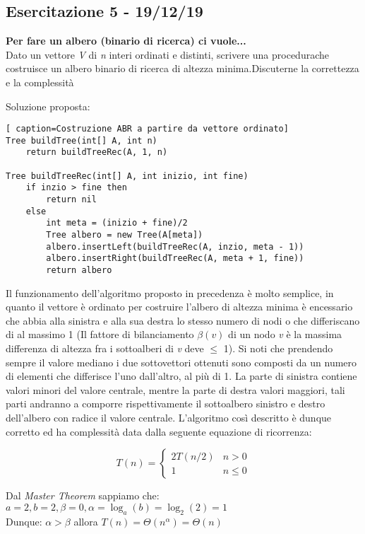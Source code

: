 \documentclass[../cheatSheetAlgoritmi.tex]{subfiles}
\begin{document}
\subsection{Esercitazione 5 - 19/12/19}
\textbf{Per fare un albero (binario di ricerca) ci vuole...}\\
Dato un vettore \textit{V} di \textit{n} interi ordinati e distinti, scrivere una procedurache costruisce un albero binario di ricerca di altezza minima.Discuterne la correttezza e la complessità

\bigskip
Soluzione proposta:
\begin{lstlisting}[ caption=Costruzione ABR a partire da vettore ordinato]
Tree buildTree(int[] A, int n)
	return buildTreeRec(A, 1, n)

Tree buildTreeRec(int[] A, int inizio, int fine)
	if inzio > fine then 
    	return nil
  	else
    	int meta = (inizio + fine)/2
    	Tree albero = new Tree(A[meta])
    	albero.insertLeft(buildTreeRec(A, inzio, meta - 1))
    	albero.insertRight(buildTreeRec(A, meta + 1, fine))
    	return albero
\end{lstlisting}
Il funzionamento dell'algoritmo proposto in precedenza è molto semplice, in quanto il vettore è ordinato per costruire l'albero di altezza minima è encessario che abbia alla sinistra e alla sua destra lo stesso numero di nodi o che differiscano di al massimo 1 (Il fattore di bilanciamento $\beta(v)$ di un nodo \textit{v} è la massima differenza
di altezza fra i sottoalberi di \textit{v} deve $\leq$ 1). Si noti che prendendo sempre il valore mediano i due sottovettori ottenuti sono composti da un numero di elementi che differisce l'uno dall'altro, al più di 1. La parte di sinistra contiene valori minori del valore centrale, mentre la parte di destra valori maggiori, tali parti andranno a comporre rispettivamente il sottoalbero sinistro e destro dell'albero con radice il valore centrale.
L'algoritmo così descritto è dunque corretto ed ha complessità data dalla seguente equazione di ricorrenza:
\begin{center}
	\begin{equation*}
  		T(n)=\begin{cases}
    		2T(n/2)  & \text{$n > 0$}\\
    		1 & \text{$n \leq 0$}
  		\end{cases}
	\end{equation*}
\end{center}
Dal \textit{Master Theorem} sappiamo che:\\
$a = 2, b = 2, \beta = 0, \alpha = \log_a(b) = \log_2(2) = 1$\\
Dunque: $\alpha > \beta$ allora $T(n) = \Theta(n^\alpha) = \Theta(n)$ 
\end{document}
